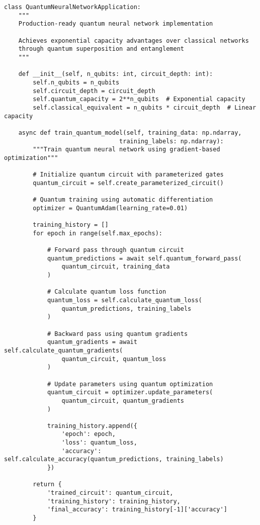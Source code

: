 \documentclass[12pt,a4paper]{report}
\begin{document}
\begin{lstlisting}
class QuantumNeuralNetworkApplication:
    """
    Production-ready quantum neural network implementation

    Achieves exponential capacity advantages over classical networks
    through quantum superposition and entanglement
    """

    def __init__(self, n_qubits: int, circuit_depth: int):
        self.n_qubits = n_qubits
        self.circuit_depth = circuit_depth
        self.quantum_capacity = 2**n_qubits  # Exponential capacity
        self.classical_equivalent = n_qubits * circuit_depth  # Linear capacity

    async def train_quantum_model(self, training_data: np.ndarray,
                                training_labels: np.ndarray):
        """Train quantum neural network using gradient-based optimization"""

        # Initialize quantum circuit with parameterized gates
        quantum_circuit = self.create_parameterized_circuit()

        # Quantum training using automatic differentiation
        optimizer = QuantumAdam(learning_rate=0.01)

        training_history = []
        for epoch in range(self.max_epochs):

            # Forward pass through quantum circuit
            quantum_predictions = await self.quantum_forward_pass(
                quantum_circuit, training_data
            )

            # Calculate quantum loss function
            quantum_loss = self.calculate_quantum_loss(
                quantum_predictions, training_labels
            )

            # Backward pass using quantum gradients
            quantum_gradients = await self.calculate_quantum_gradients(
                quantum_circuit, quantum_loss
            )

            # Update parameters using quantum optimization
            quantum_circuit = optimizer.update_parameters(
                quantum_circuit, quantum_gradients
            )

            training_history.append({
                'epoch': epoch,
                'loss': quantum_loss,
                'accuracy': self.calculate_accuracy(quantum_predictions, training_labels)
            })

        return {
            'trained_circuit': quantum_circuit,
            'training_history': training_history,
            'final_accuracy': training_history[-1]['accuracy']
        }
\end{lstlisting}
\end{document}
